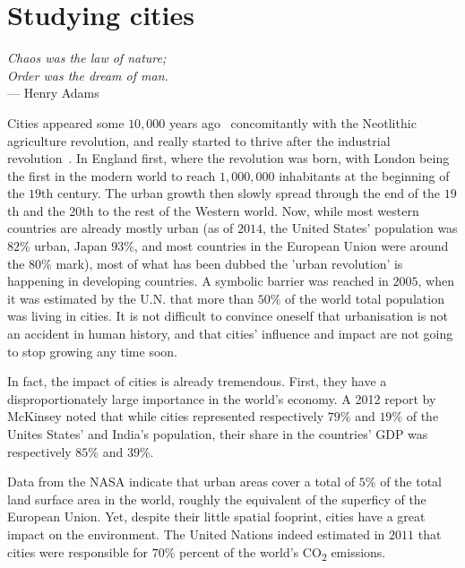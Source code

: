 \chapter{Studying cities}
\label{chap:studying_cities}

\begin{flushright}{\slshape    
Chaos was the law of nature;\\
Order was the dream of man.} \\ \medskip
--- Henry Adams~\cite{Adams:1990}
\end{flushright}

\bigskip

Cities appeared some $10,000$ years ago~\cite{Bairoch:1985, Mumford:1961}
concomitantly with the Neotlithic agriculture revolution, and really started to
thrive after the industrial revolution~\cite{Bairoch:1985}.  In England first,
where the revolution was born, with London being the first in the modern world
to reach $1,000,000$ inhabitants at the beginning of the $19$th century. The
urban growth then slowly spread through the end of the $19$th and the $20$th to
the rest of the Western world. Now, while most western countries are already
mostly urban (as of $2014$, the United States' population was $82\%$ urban,
Japan $93\%$, and most countries in the European Union were around the $80\%$
mark), most of what has been dubbed the 'urban  revolution' is happening in developing countries. A symbolic
barrier was reached in $2005$, when it was estimated by the U.N. that more than
$50\%$ of the world total population was living in cities. It is not difficult
to convince oneself that urbanisation is not an accident in human history, and
that cities' influence and impact are not going to stop growing any time soon.

In fact, the impact of cities is already tremendous. First, they have a
disproportionately large importance in the world's economy. A 2012 report by
McKinsey noted that while cities represented respectively $79\%$ and $19\%$ of the Unites
States' and India's population, their share in the countries' GDP was
respectively $85\%$ and $39\%$. 

Data from the NASA indicate that urban areas cover a total of $5\%$ of the total
land surface area in the world, roughly the equivalent of the superficy of the
European Union. Yet, despite their little spatial fooprint, cities have a great
impact on the environment. The United Nations indeed estimated in $2011$ that cities were
responsible for $70\%$ percent of the world's CO\textsubscript{2} emissions.

